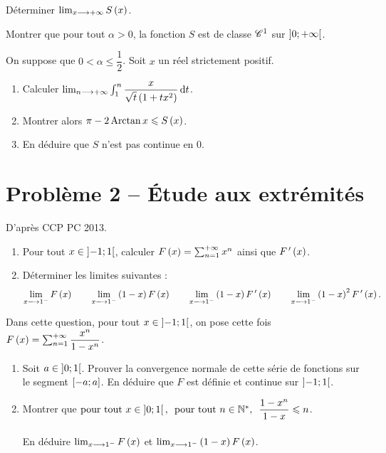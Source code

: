 \begin{q}
Déterminer \(\lim_{x\longrightarrow+\infty}S\left(x\right)\).
\end{q}

\begin{q}
Montrer que pour tout \(\alpha>0\), la fonction \(S\) est de classe \(\mathscr{C}^{1}\) sur \(\left]0;+\infty\right[\).
\end{q}

\begin{q}
On suppose que \(0<\alpha\leq\dfrac{1}{2}\). Soit \(x\) un réel strictement positif.

\begin{enumerate}
    \item Calculer \(\lim_{n\to\pinf}\int_1^n\dfrac{x}{\sqrt{t}\paren{1+tx^2}}\odif{t}\). \\
    \item Montrer alors \(\pi-2\operatorname{Arctan} x\leqslant S\left(x\right)\). \\
    \item En déduire que \(S\) n'est pas continue en \(0\).
\end{enumerate}
\end{q}

\section*{Problème 2 -- Étude aux extrémités}
\setcounter{q}{0}

D'après CCP PC 2013.

\begin{q}
\begin{enumerate}
    \item Pour tout \(x\in\left]-1;1\right[\), calculer \(F\left(x\right)=\sum_{n=1}^{+\infty}x^n\) ainsi que \(F^{\,\prime}\left(x\right)\). \\
    \item Déterminer les limites suivantes : \[\lim_{x\longrightarrow1^-}F\left(x\right)\qquad\lim_{x\longrightarrow1^-}\left(1-x\right)F\left(x\right)\qquad\lim_{x\longrightarrow1^-}\left(1-x\right)F^{\,\prime}\left(x\right)\qquad\lim_{x\longrightarrow1^-}\left(1-x\right)^2F^{\,\prime}\left(x\right).\]
\end{enumerate}
\end{q}

\begin{q}
Dans cette question, pour tout \(x\in\left]-1;1\right[\), on pose cette fois \(F\left(x\right)=\sum_{n=1}^{+\infty}\dfrac{x^n}{1-x^n}\).

\begin{enumerate}
    \item Soit \(a\in\left]0;1\right[\). Prouver la convergence normale de cette série de fonctions sur le segment \(\left[-a;a\right]\). En déduire que \(F\) est définie et continue sur \(\left]-1;1\right[\). \\
    \item Montrer que \(\quantifs{\tpt x\in\intervee{0}{1};\tpt n\in\Ns}\dfrac{1-x^n}{1-x}\leq n\). \\\\ En déduire \(\lim_{x\longrightarrow1^-}F\left(x\right)\) et \(\lim_{x\longrightarrow1^-}\left(1-x\right)F\left(x\right)\).
\end{enumerate}
\end{q}

